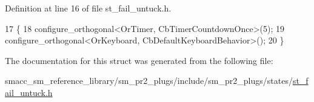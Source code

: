 Definition at line 16 of file st\+\_\+fail\+\_\+untuck.\+h.


\begin{DoxyCode}
17     \{
18         configure\_orthogonal<OrTimer,  CbTimerCountdownOnce>(5);    
19         configure\_orthogonal<OrKeyboard, CbDefaultKeyboardBehavior>();
20     \}
\end{DoxyCode}


The documentation for this struct was generated from the following file\+:\begin{DoxyCompactItemize}
\item 
smacc\+\_\+sm\+\_\+reference\+\_\+library/sm\+\_\+pr2\+\_\+plugs/include/sm\+\_\+pr2\+\_\+plugs/states/\hyperlink{st__fail__untuck_8h}{st\+\_\+fail\+\_\+untuck.\+h}\end{DoxyCompactItemize}
